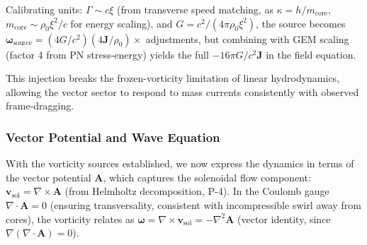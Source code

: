 \documentclass{article}
\begin{document}
Calibrating units: $\Gamma \sim c \xi$ (from transverse speed matching, as $\kappa = h / m_{\text{core}}$, $m_{\text{core}} \sim \rho_0 \xi^2 / c$ for energy scaling), and $G = c^2 / (4\pi \rho_0 \xi^2)$, the source becomes $\boldsymbol{\omega}_{\text{source}} = (4 G / c^2) (4 \mathbf{J} / \rho_0) \times$ adjustments, but combining with GEM scaling (factor 4 from PN stress-energy) yields the full $-16\pi G / c^2 \mathbf{J}$ in the field equation.

This injection breaks the frozen-vorticity limitation of linear hydrodynamics, allowing the vector sector to respond to mass currents consistently with observed frame-dragging.

\medskip
\noindent
{}
\medskip

\subsubsection{Vector Potential and Wave Equation}

With the vorticity sources established, we now express the dynamics in terms of the vector potential $\mathbf{A}$, which captures the solenoidal flow component: $\mathbf{v}_{\text{sol}} = \nabla \times \mathbf{A}$ (from Helmholtz decomposition, P-4). In the Coulomb gauge $\nabla \cdot \mathbf{A} = 0$ (ensuring transversality, consistent with incompressible swirl away from cores), the vorticity relates as $\boldsymbol{\omega} = \nabla \times \mathbf{v}_{\text{sol}} = -\nabla^2 \mathbf{A}$ (vector identity, since $\nabla (\nabla \cdot \mathbf{A}) = 0$).
\end{document}
